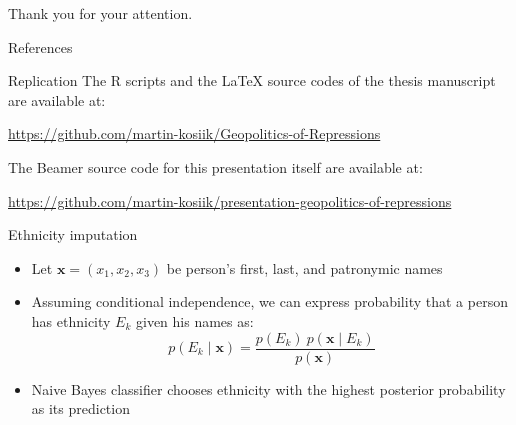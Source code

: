 \documentclass[11pt]{beamer}
\begin{document}
{
\begin{frame}[standout]
  Thank you for your attention.
\end{frame}
}

\appendix

\begin{frame}[allowframebreaks]{References}
\printbibliography
\end{frame}

\begin{frame}{Replication}
The R scripts and the LaTeX source codes of the thesis manuscript are available at:
  \begin{center}\url{https://github.com/martin-kosiik/Geopolitics-of-Repressions}\end{center}

The Beamer source code for this presentation itself are available at: 
\begin{center}\url{https://github.com/martin-kosiik/presentation-geopolitics-of-repressions}\end{center}
\end{frame}



\begin{frame}[label=ethnicity_imputation]{Ethnicity imputation}
\begin{itemize}
    \item Let  $\boldsymbol{x} = \left(x_1, x_2, x_3\right)$ be person's first, last, and patronymic names
    \item Assuming conditional independence, we can express probability that a person has ethnicity $E_k$ given his names as:
    \begin{equation*}
p(E_k \mid \mathbf{x}) = \frac{p(E_k) \ p(\mathbf{x} \mid E_k)}{p(\mathbf{x})}
\end{equation*}
    \item Naive Bayes classifier chooses ethnicity with the highest posterior probability as its prediction

\end{itemize}
\hyperlink{data}{}
\end{frame}
\end{document}
